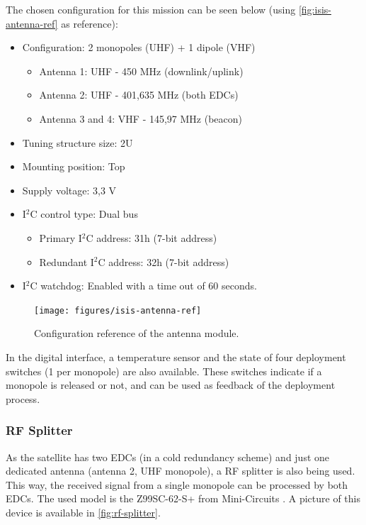The chosen configuration for this mission can be seen below (using \autoref{fig:isis-antenna-ref} as reference):

\begin{itemize}
    \item Configuration: 2 monopoles (UHF) + 1 dipole (VHF)
        \begin{itemize}
            \item Antenna 1: UHF - 450 MHz (downlink/uplink)
            \item Antenna 2: UHF - 401,635 MHz (both EDCs)
            \item Antenna 3 and 4: VHF - 145,97 MHz (beacon)
        \end{itemize}
    \item Tuning structure size: 2U
    \item Mounting position: Top
    \item Supply voltage: 3,3 V
    \item I$^{2}$C control type: Dual bus
        \begin{itemize}
            \item Primary I$^{2}$C address: 31h (7-bit address)
            \item Redundant I$^{2}$C address: 32h (7-bit address)
        \end{itemize}
    \item I$^{2}$C watchdog: Enabled with a time out of 60 seconds.
\end{itemize}

\begin{figure}[!ht]
    \begin{center}
        \texttt{[image: figures/isis-antenna-ref]}
        \caption{Configuration reference of the antenna module.}
        \label{fig:isis-antenna-ref}
    \end{center}
\end{figure}

In the digital interface, a temperature sensor and the state of four deployment switches (1 per monopole) are also available. These switches indicate if a monopole is released or not, and can be used as feedback of the deployment process.

\subsubsection{RF Splitter}

As the satellite has two EDCs (in a cold redundancy scheme) and just one dedicated antenna (antenna 2, UHF monopole), a RF splitter is also being used. This way, the received signal from a single monopole can be processed by both EDCs. The used model is the Z99SC-62-S+ from Mini-Circuits \cite{z99sc-62-s}. A picture of this device is available in \autoref{fig:rf-splitter}.

